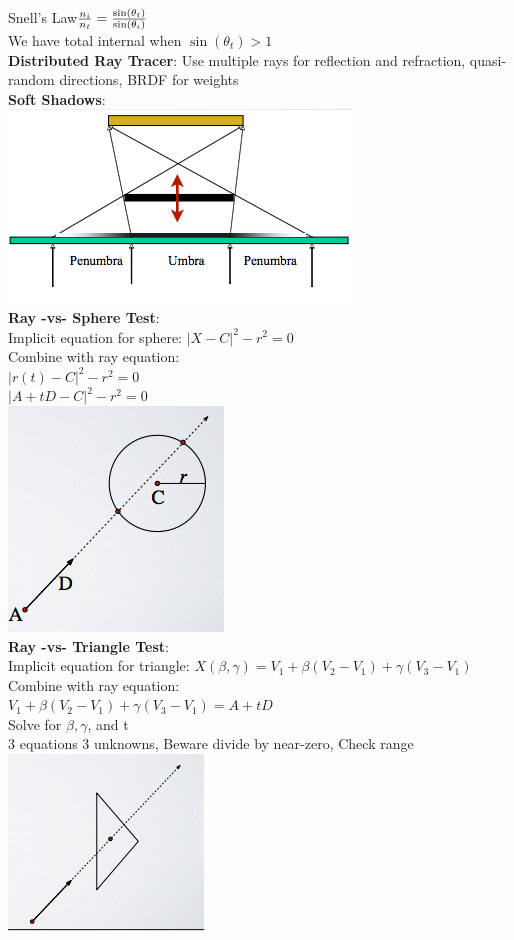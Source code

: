 \documentclass[3pt,landscape]{article}
\begin{document}
\begin{multicols}{3}
Snell's Law$\Large{\frac{n_i}{n_t}  = \frac{\sin(\theta_t)}{\sin(\theta_i)}}$\\
We have total internal when $\sin(\theta_t) > 1$\\
{\bf Distributed Ray Tracer}: Use multiple rays for reflection and refraction, quasi-random directions, BRDF for weights\\
{\bf Soft Shadows}: \\
\includegraphics[scale=1.0]{images/softshadow}\\
{\bf Ray -vs- Sphere Test}:\\
Implicit equation for sphere: $|X-C| ^ 2 - r^2  = 0$\\
Combine with ray equation:\\
$|r(t)-C| ^ 2 - r^2  = 0$\\
$| A+tD-C| ^ 2 - r^2  = 0$\\
\includegraphics[scale=1.0]{images/raycircle}\\
{\bf Ray -vs- Triangle Test}:\\
Implicit equation for triangle: $X(\beta, \gamma) = V_1 + \beta(V_2 - V_1)  + \gamma(V_3 - V_1)$\\
Combine with ray equation:\\
$ V_1 + \beta(V_2 - V_1)  + \gamma(V_3 - V_1) = A+tD$\\
Solve for $\beta, \gamma$, and t\\
3 equations 3 unknowns, Beware divide by near-zero, Check range\\
\includegraphics[scale=1.0]{images/raytri}



\end{multicols}
\end{document}
